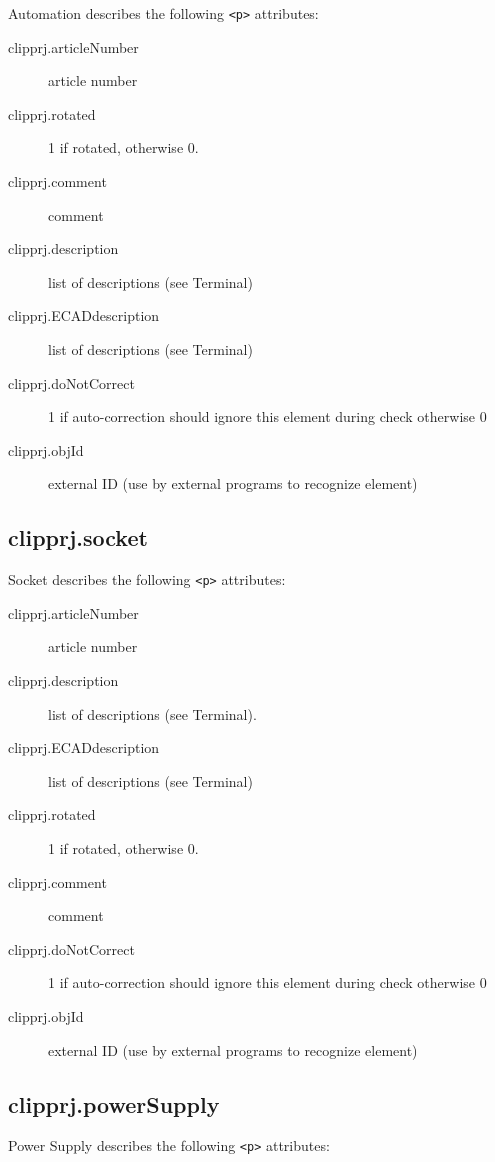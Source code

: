 \documentclass[%
	a4paper,
	oneside,
	listof=numbered,
	parskip=half,
	headsepline=true,
	footsepline=false,
	normalheadings,
	0.7headlines,
	headexclude,
	]{scrbook}
\begin{document}
Automation describes the following \verb|<p>| attributes: 

\begin{description}
	\item[clipprj.articleNumber] article number 
	\item[clipprj.rotated] 1 if rotated, otherwise 0. 
	\item[clipprj.comment] comment 
	\item[clipprj.description] list of descriptions (see Terminal) 
	\item[clipprj.ECADdescription] list of descriptions (see Terminal) 
	\item[clipprj.doNotCorrect] 1 if auto-correction should ignore this element during check otherwise 0 
	\item[clipprj.objId] external ID (use by external programs to recognize element)
\end{description}

\subsection{clipprj.socket}
 
Socket describes the following \verb|<p>| attributes: 

\begin{description}
	\item[clipprj.articleNumber] article number 
	\item[clipprj.description] list of descriptions (see Terminal). 
	\item[ clipprj.ECADdescription] list of descriptions (see Terminal) 
	\item[clipprj.rotated] 1 if rotated, otherwise 0. 
	\item[clipprj.comment] comment 
	\item[clipprj.doNotCorrect] 1 if auto-correction should ignore this element during check otherwise 0 
	\item[clipprj.objId] external ID (use by external programs to recognize element) 
\end{description}

\subsection{clipprj.powerSupply}
 
Power Supply describes the following \verb|<p>| attributes: 
\end{document}
